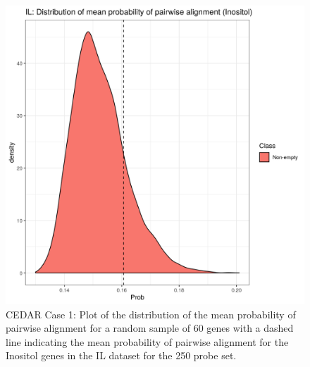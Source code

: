 \documentclass[14pt]{extarticle} %
\begin{document}
	\begin{figure}[h]
		\centering
		\includegraphics[scale=0.75]{Images/Biology_data/Set_250/All_datasets/Mean_alignment_probability/IL_KEGG_INOSITOL_PHOSPHATE_METABOLISM.png}
		\caption{CEDAR Case 1: Plot of the distribution of the mean probability of pairwise alignment for a random sample of 60 genes with a dashed line indicating the mean probability of pairwise alignment for the Inositol genes in the IL dataset for the 250 probe set.}
		\label{fig:results:cedar_1:mdi_il_inostiol_alignemnt_prob_distn}
	\end{figure}
\end{document}
